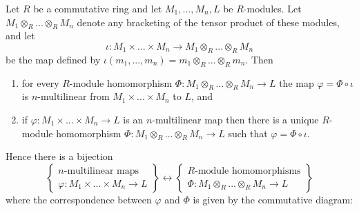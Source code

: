 \documentclass[12pt, a4paper, oneside, openright, titlepage]{book}
\begin{document}
\begin{cor}
    Let $R$ be a commutative ring and let $M_1,...,M_n,L$ be $R$-modules. Let $M_1\otimes_R...\otimes_R M_n$ denote any bracketing of the tensor product of these modules, and let\begin{equation*}
        \iota:M_1\times ... \times M_n\rightarrow M_1\otimes_R...\otimes_R M_n
    \end{equation*}
    be the map defined by $\iota(m_1,...,m_n) = m_1\otimes_R...\otimes_Rm_n$. Then \begin{enumerate}
        \item for every $R$-module homomorphism $\Phi:M_1\otimes_R...\otimes_RM_n\rightarrow L$ the map $\varphi = \Phi\circ \iota$ is $n$-multilinear from $M_1\times ... \times M_n$ to $L$, and 
        \item if $\varphi:M_1\times ... \times M_n\rightarrow L$ is an $n$-multilinear map then there is a unique $R$-module homomorphism $\Phi:M_1\otimes_R...\otimes_RM_n\rightarrow L$ such that $\varphi = \Phi\circ \iota$.
    \end{enumerate}
    Hence there is a bijection 
    \begin{equation*}
        \left\{\begin{array}{c} n\text{-multilinear maps} \\ \varphi:M_1\times ...\times M_n\rightarrow L\end{array}\right\}\leftrightarrow \left\{\begin{array}{c} \text{$R$-module homomorphisms} \\ \Phi:M_1\otimes_R ...\otimes_RM_n\rightarrow L\end{array}\right\}
    \end{equation*}
    where the correspondence between $\varphi$ and $\Phi$ is given by the commutative diagram:
    \begin{center}
    \end{center}
\end{cor}
\end{document}
